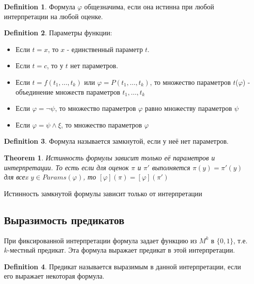 \documentclass[a4paper]{article}
\theoremstyle{plain}
\newtheorem{theorem}{Theorem}
\theoremstyle{remark}
\theoremstyle{definition}
\newtheorem{definition}{Definition}
\begin{document}
\begin{definition}
	Формула $\varphi$ общезначима, если она истинна при любой интерпретации на любой оценке. 
\end{definition}

\begin{definition}
	Параметры функции:
	\begin{itemize}
		\item Если $t = x$, то $x$ - единственный параметр $t$.
		\item Если $t = c$, то у $t$ нет параметров. 
		\item Если $t = f(t_1, \ldots, t_k)$ или $\varphi = P(t_1, \ldots, t_k)$, то множество параметров $t$($\varphi$) - объединение множеств параметров $t_1, \ldots, t_k$
		\item Если $\varphi = \lnot \psi$, то множество параметров $\varphi$ равно множеству параметров $\psi$
		\item Если $\varphi = \psi \land \xi$, то множество параметров $\varphi$
	\end{itemize}
\end{definition}

\begin{definition}
	Формула называется замкнутой, если у неё нет параметров.
\end{definition}


\begin{theorem}
	Истинность формулы зависит только её параметров и интерпретации. То есть если для оценок $\pi$ и $\pi'$ выполняется $\pi(y) = \pi'(y)$ для всеx $y \in Params( \varphi)$, то $[\varphi](\pi) = [\varphi](\pi')$
\end{theorem}

\begin{corollary}
	Истинность замкнутой формулы зависит только от интерпретации
\end{corollary}
\subsection{Выразимость предикатов}
\begin{corollary}
	При фиксированной интерпретации формула задает функцию из $M^k$ в $\{0,1\}$, т.е. $k$-местный предикат. Эта формула выражает предикат в этой интерпретации. 
\end{corollary}

\begin{definition}
	Предикат называется выразимым в данной интерпретации, если его выражает некоторая формула.
\end{definition}
\end{document}

